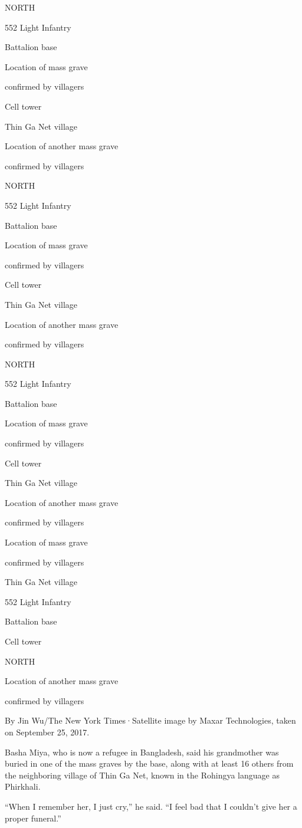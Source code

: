 NORTH

552 Light Infantry

Battalion base

Location of mass grave

confirmed by villagers

Cell tower

Thin Ga Net village

Location of another mass grave

confirmed by villagers

NORTH

552 Light Infantry

Battalion base

Location of mass grave

confirmed by villagers

Cell tower

Thin Ga Net village

Location of another mass grave

confirmed by villagers

NORTH

552 Light Infantry

Battalion base

Location of mass grave

confirmed by villagers

Cell tower

Thin Ga Net village

Location of another mass grave

confirmed by villagers

Location of mass grave

confirmed by villagers

Thin Ga Net village

552 Light Infantry

Battalion base

Cell tower

NORTH

Location of another mass grave

confirmed by villagers

By Jin Wu/The New York Times·Satellite image by Maxar Technologies,
taken on September 25, 2017.

Basha Miya, who is now a refugee in Bangladesh, said his grandmother was
buried in one of the mass graves by the base, along with at least 16
others from the neighboring village of Thin Ga Net, known in the
Rohingya language as Phirkhali.

``When I remember her, I just cry,'' he said. ``I feel bad that I
couldn't give her a proper funeral.''

